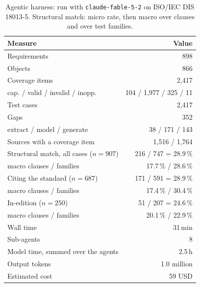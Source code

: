 \begin{table}[t]
  \centering
  \caption{Agentic harness: run with \texttt{claude-fable-5-2} on ISO/IEC DIS
    18013-5. Structural match: micro rate, then macro over clauses and over
    test families.}
  \label{tab:harness-run}
  \small\setlength{\tabcolsep}{4pt}
  \begin{tabular}{lr}
    \toprule
    Measure & Value \\
    \midrule
    Requirements                            & 898 \\
    Objects                                 & 866 \\
    Coverage items                          & 2,417 \\
    \quad cap. / valid / invalid / inopp.   & 104 / 1,977 / 325 / 11 \\
    Test cases                              & 2,417 \\
    Gaps                                    & 352 \\
    \quad extract / model / generate        & 38 / 171 / 143 \\
    Sources with a coverage item            & 1,516 / 1,764 \\
    \midrule
    Structural match, all cases ($n = 907$) & 216 / 747 = 28.9\,\% \\
    \quad macro clauses / families          & 17.7\,\% / 28.6\,\% \\
    Citing the standard ($n = 687$)         & 171 / 591 = 28.9\,\% \\
    \quad macro clauses / families          & 17.4\,\% / 30.4\,\% \\
    In-edition ($n = 250$)                  & 51 / 207 = 24.6\,\% \\
    \quad macro clauses / families          & 20.1\,\% / 22.9\,\% \\
    \midrule
    Wall time                               & 31\,min \\
    Sub-agents                              & 8 \\
    Model time, summed over the agents      & 2.5\,h \\
    Output tokens                           & 1.0 million \\
    Estimated cost                          & 59 USD \\
    \bottomrule
  \end{tabular}
\end{table}

